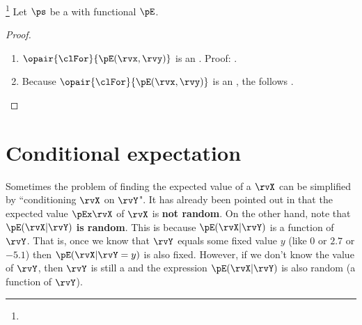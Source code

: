 \begin{theorem}
\footnote{
  }
Let $\ps$ be a  with  functional $\pE$.
\end{theorem}
\begin{proof}
\begin{enumerate}
  \item $\opair{\clFor}{\pE(\rvx,\rvy)}$ is an . Proof: .

  \item Because $\opair{\clFor}{\pE(\rvx,\rvy)}$ is an , the 
        follows .
\end{enumerate}
\end{proof}

\section{Conditional expectation}
Sometimes the problem of finding the expected value of a  $\rvX$
can be simplified by ``conditioning $\rvX$ on $\rvY$".
It has already been pointed out in 
that the expected value $\pEx\rvX$  of $\rvX$ is \textbf{not random}.
On the other hand,
note that $\pE(\rvX|\rvY)$ \textbf{is random}.
This is because $\pE(\rvX|\rvY)$ is a function of $\rvY$.
That is, once we know that $\rvY$ equals some fixed value $y$
(like $0$ or $2.7$ or $-5.1$) then $\pE(\rvX|\rvY=y)$ is also fixed.
However, if we don't know the value of $\rvY$,
then $\rvY$ is still a  and the expression $\pE(\rvX|\rvY)$
is also random (a function of  $\rvY$).

